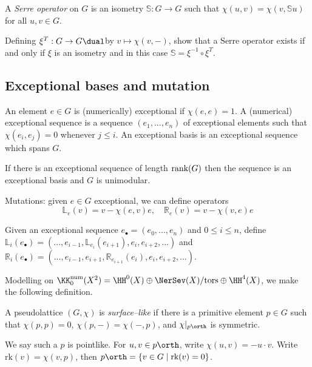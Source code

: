 \begin{definition}
    A \emph{Serre operator} on \(G\) is an isometry \(\mathbb{S}:G\to G\) such that
    \(\chi(u,v)=\chi(v,\mathbb{S}u)\) for all \(u,v\in G\).
\end{definition}

\begin{exercise}
    Defining \(\xi^T:G\to G\dual\)by \(v\mapsto \chi(v,-)\), show that a Serre
    operator exists if and only if \(\xi\) is an isometry and in this case
    \(\mathbb{S}=\xi^{-1}\circ \xi^T\).
\end{exercise}

\subsection{Exceptional bases and mutation} An element \(e\in G\) is
(numerically) exceptional if \(\chi(e,e)=1\). A (numerical) exceptional sequence
is a sequence \((e_1,...,e_n)\) of exceptional elements such that
\(\chi(e_i,e_j)=0\) whenever \(j\leq i\). An exceptional basis is an exceptional
sequence which spans \(G\).

\begin{lemma}
    If there is an exceptional sequence of length \(\textnormal{rank}(G)\) then the
    sequence is an exceptional basis and \(G\) is unimodular.
\end{lemma}

Mutations: given \(e\in G\) exceptional, we can define operators
\[\mathbb{L}_e(v)=v-\chi(e,v)e, \quad \mathbb{R}_e(v)=v-\chi(v,e)e\]

Given an exceptional sequence \(e_\bullet=(e_0,...,e_n)\) and \(0\leq i \leq
n\), define \(\mathbb{L}_i(e_\bullet)=(...,e_{i-1}, \mathbb{L}_{e_i}(e_{i+1}),
e_i, e_{i+2}, ...)\) and  \(\mathbb{R}_i(e_\bullet)=(...,e_{i-1}, e_{i+1},
\mathbb{R}_{e_{i+1}}(e_i), e_i, e_{i+2}, ...)\).

Modelling on \(\KK_0^\text{num}(X^2)=\HH^0(X)\oplus \NerSev(X)/\text{tors} \oplus
\HH^4(X)\), we make the following definition.

\begin{definition}
A pseudolattice \((G,\chi)\) is \emph{surface--like} if there is a primitive
element \(p\in G\) such that \(\chi(p,p)=0\), \(\chi(p,-)=\chi(-,p)\), and
\(\chi|_{p\orth}\) is symmetric.
\end{definition}

We say such a \(p\) is pointlike. For \(u,v\in p\orth\), write
\(\chi(u,v)=-u\cdot v\). Write \(\text{rk}(v)=\chi(v,p)\), then \(p\orth =
\{v\in G\;|\; \text{rk}(v)=0\}\).


